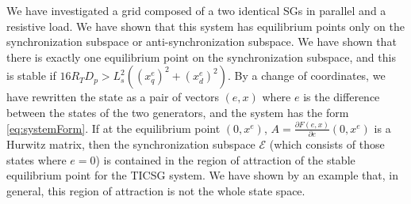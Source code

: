 \documentclass[letterpaper, 10 pt, conference]{ieeeconf}
\begin{document}
We have investigated a grid composed of a two identical SGs in
parallel and a resistive load. We have shown that this system has
equilibrium points only on the synchronization subspace or
anti-synchronization subspace. We have shown that there is exactly one
equilibrium point on the synchronization subspace, and this is stable
if $16 R_T D_p>L_s^2\left(\left(x_q^e\right)^2+\left(x_d^e\right)^2
\right)$. By a change of coordinates, we have rewritten the state as a
pair of vectors $(e,x)$ where $e$ is the difference between the states
of the two generators, and the system has the form 
\eqref{eq:systemForm}. If at the equilibrium point $(0,x^e)$,
$A=\frac{\partial F(e,x)}{\partial e}\left(0,x^e\right)$ is a Hurwitz
matrix, then the synchronization subspace $\mathscr{E}$ (which
consists of those states where $e=0$) is contained in the region of
attraction of the stable equilibrium point for the TICSG system. We
have shown by an example that, in general, this region of attraction
is not the whole state space.
\end{document}
